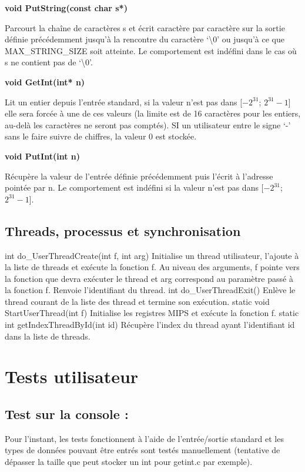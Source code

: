 \documentclass[12pt]{report}
\begin{document}
\textbf{void PutString(const char s*)}

Parcourt la chaîne de caractères s et écrit caractère par caractère sur la sortie définie précédemment jusqu’à la rencontre du caractère ‘\textbackslash 0’ ou jusqu’à ce que MAX\_STRING\_SIZE soit atteinte. Le comportement est indéfini dans le cas où s ne contient pas de ‘\textbackslash 0’.

\textbf{void GetInt(int* n)}

Lit un entier depuis l'entrée standard, si la valeur n'est pas dans [$-2^{31}$; $2^{31}-1$] elle sera forcée à une de ces valeurs (la limite est de 16 caractères pour les entiers, au-delà les caractères ne seront pas comptés). SI un utilisateur entre le signe ‘-’ sans le faire suivre de chiffres, la valeur 0 est stockée.

\textbf{void PutInt(int n)}

Récupère la valeur de l’entrée définie précédemment puis l’écrit à l’adresse pointée par n. Le comportement est indéfini si la valeur n'est pas dans [$-2^{31}$; $2^{31}-1$].

\section{Threads, processus et synchronisation}
int do\_UserThreadCreate(int f, int arg)
Initialise un thread utilisateur, l’ajoute à la liste de threads et exécute la fonction f. Au niveau des arguments, f pointe vers la fonction que devra exécuter le thread et arg correspond au paramètre passé à la fonction f. Renvoie l’identifiant du thread.
int do\_UserThreadExit()
Enlève le thread courant de la liste des thread et termine son exécution.
static void StartUserThread(int f)
Initialise les registres MIPS et exécute la fonction f.
static int getIndexThreadById(int id)
Récupère l’index du thread ayant l’identifiant id dans la liste de threads.



\chapter{Tests utilisateur}
\section{Test sur la console :}
Pour l’instant, les tests fonctionnent à l’aide de l’entrée/sortie standard et les types de données pouvant être entrés sont testés manuellement (tentative de dépasser la taille que peut stocker un int pour getint.c par exemple).
\end{document}
